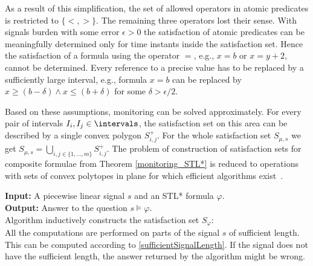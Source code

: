 As a result of this simplification, the set of allowed operators in atomic predicates is restricted to $\lbrace <, > \rbrace$. The remaining three operators lost their sense. With signals burden with some error $\epsilon > 0$ the satisfaction of atomic predicates can be meaningfully determined only for time instants inside the satisfaction set. 
Hence the satisfaction of a formula using the operator $=$, e.g., $x = b$ or $x = y + 2$, cannot be determined. Every reference to a precise value has to be replaced by a sufficiently large interval, e.g., formula $x = b$ can be replaced by $x \geq (b - \delta) \wedge x \leq (b + \delta)$ for some $\delta > \epsilon / 2$.

Based on these assumptions, monitoring can be solved approximately. For every pair of intervals $I_i, I_j \in\intervals$, the satisfaction set on this area can be described by a single convex polygon $S^+_{i,j}$. For the whole satisfaction set $S_{\mu,s}$ we get $S_{\mu,s} = \bigcup_{i, j \in\{1,...,m\}} S^+_{i,j}$. The problem of construction of satisfaction sets for composite formulae from Theorem \ref{monitoring_STL*} is reduced to operations with sets of convex polytopes in plane for which efficient algorithms exist~\cite{GeometricAlgorithms}. 
 
\begin{algorithm}
\label{algorithm1}

\end{algorithm}
\smallskip
\textbf{Input:} A piecewise linear signal $s$ and an STL* formula $\varphi$.\\
\textbf{Output:} Answer to the question $s \models \varphi$.\\

Algorithm inductively constructs the satisfaction set $S_{\varphi}$:\\

All the computations are performed on parts of the signal $s$ of sufficient length. This can be computed according to \eqref{sufficientSignalLength}. If the signal does not have the sufficient length, the answer returned by the algorithm might be wrong. 


